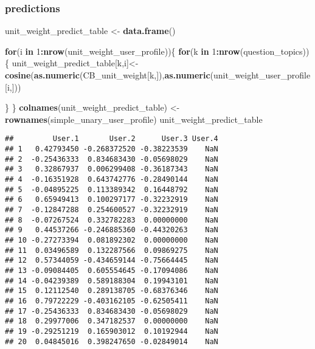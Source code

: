 \documentclass[]{article}
\newenvironment{Shaded}{\begin{snugshade}}{\end{snugshade}}
\newcommand{\ControlFlowTok}[1]{\textcolor[rgb]{0.13,0.29,0.53}{\textbf{#1}}}
\newcommand{\DecValTok}[1]{\textcolor[rgb]{0.00,0.00,0.81}{#1}}
\newcommand{\KeywordTok}[1]{\textcolor[rgb]{0.13,0.29,0.53}{\textbf{#1}}}
\newcommand{\NormalTok}[1]{#1}
\newcommand{\OperatorTok}[1]{\textcolor[rgb]{0.81,0.36,0.00}{\textbf{#1}}}
\newcommand{\StringTok}[1]{\textcolor[rgb]{0.31,0.60,0.02}{#1}}
\begin{document}
\hypertarget{predictions}{%
\subsubsection{predictions}\label{predictions}}

\begin{Shaded}
\begin{Highlighting}[]
\NormalTok{unit_weight_predict_table <-}\StringTok{ }\KeywordTok{data.frame}\NormalTok{()}


\ControlFlowTok{for}\NormalTok{(i }\ControlFlowTok{in} \DecValTok{1}\OperatorTok{:}\KeywordTok{nrow}\NormalTok{(unit_weight_user_profile))\{}
  \ControlFlowTok{for}\NormalTok{(k }\ControlFlowTok{in} \DecValTok{1}\OperatorTok{:}\KeywordTok{nrow}\NormalTok{(question_topics))\{}
\NormalTok{    unit_weight_predict_table[k,i]<-}\StringTok{ }\KeywordTok{cosine}\NormalTok{(}\KeywordTok{as.numeric}\NormalTok{(CB_unit_weight[k,]),}\KeywordTok{as.numeric}\NormalTok{(unit_weight_user_profile[i,]))}
  
\NormalTok{  \}}
\NormalTok{\}}
\KeywordTok{colnames}\NormalTok{(unit_weight_predict_table) <-}\StringTok{ }\KeywordTok{rownames}\NormalTok{(simple_unary_user_profile)}
\NormalTok{unit_weight_predict_table}
\end{Highlighting}
\end{Shaded}

\begin{verbatim}
##         User.1       User.2      User.3 User.4
## 1   0.42793450 -0.268372520 -0.38223539    NaN
## 2  -0.25436333  0.834683430 -0.05698029    NaN
## 3   0.32867937  0.006299408 -0.36187343    NaN
## 4  -0.16351928  0.643742776 -0.28490144    NaN
## 5  -0.04895225  0.113389342  0.16448792    NaN
## 6   0.65949413  0.100297177 -0.32232919    NaN
## 7  -0.12847288  0.254600527 -0.32232919    NaN
## 8  -0.07267524  0.332782283  0.00000000    NaN
## 9   0.44537266 -0.246885360 -0.44320263    NaN
## 10 -0.27273394  0.081892302  0.00000000    NaN
## 11  0.03496589  0.132287566  0.09869275    NaN
## 12  0.57344059 -0.434659144 -0.75664445    NaN
## 13 -0.09084405  0.605554645 -0.17094086    NaN
## 14 -0.04239389  0.589188304  0.19943101    NaN
## 15  0.12112540  0.289138705 -0.68376346    NaN
## 16  0.79722229 -0.403162105 -0.62505411    NaN
## 17 -0.25436333  0.834683430 -0.05698029    NaN
## 18  0.29977006  0.347182537  0.00000000    NaN
## 19 -0.29251219  0.165903012  0.10192944    NaN
## 20  0.04845016  0.398247650 -0.02849014    NaN
\end{verbatim}
\end{document}
